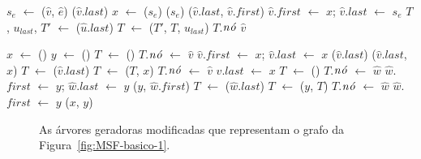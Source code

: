 \begin{algorithm}[htb]
\caption{\LCOCycle($\hat v$, $\hat e$)}
\label{Algo:LCOCycle}
\begin{algorithmic}[1]
\State $s_e$ $\gets$ \LCOFindSubNode($\hat v$, $\hat e$)
\State \linkcutEvert($\hat v$.$last$)
\State\Return
\EndIf
\State $x$ $\gets$ \linkcutParent($s_e$)
\State \linkcutDelEdge($s_e$)
\State \linkcutAddEdge($\hat v$.$last$, $\hat v$.$first$)
\State $\hat v$.$first$ $\gets$ $x$; $\hat v$.$last$ $\gets$ $s_e$
\State $T$, $u_{last}$, $T'$ $\gets$ \treapSplit($\hat u$.$last$)
\State $T$ $\gets$ \treapJoin($T'$, $T$, $u_{last}$)
\State $T$.$\mathit{n\acute{o}}$ $\hat v$
\end{algorithmic}
\end{algorithm}


\begin{algorithm}[htb]
\caption{\LCOLink($\hat v$, $\hat w$)}
\label{Algo:LCOLink}
\begin{algorithmic}[1]
\State $x$ $\gets$ \linkcutCreate()
\State $y$ $\gets$ \linkcutCreate()
  \State $T$ $\gets$ \treapCreate()
  \State $T$.$\mathit{n\acute{o}}$ $\gets$ $\hat v$
  \State $\hat v$.$first$ $\gets$ $x$; $\hat v$.$last$ $\gets$ $x$ 
\Else
  \State \linkcutEvert($\hat v$.$last$)
  \State \linkcutAddEdge($\hat v$.$last$, $x$)
  \State $T$ $\gets$ \treapGetRoot($\hat v$.$last$)
  \State $T$ $\gets$ \treapJoin($T$, $x$)
  \State $T$.$\mathit{n\acute{o}}$ $\gets$ $\hat v$
  \State $\hat v$.$last$ $\gets$ $x$
\EndIf
{}
  \State $T$ $\gets$ \treapCreate()
  \State $T$.$\mathit{n\acute{o}}$ $\gets$ $\hat w$
  \State $\hat w$.$first$ $\gets$ $y$; $\hat w$.$last$ $\gets$ $y$ 
\Else
  \State \linkcutAddEdge($y$, $\hat w$.$first$)
  \State $T$ $\gets$ \treapGetRoot($\hat w$.$last$)
  \State $T$ $\gets$ \treapJoin($y$, $T$)
  \State $T$.$\mathit{n\acute{o}}$ $\gets$ $\hat w$
  \State $\hat w$.$first$ $\gets$ $y$
\EndIf
\State \linkcutAddEdge($x$, $y$)
\end{algorithmic}
\end{algorithm}


\begin{figure}[htb]
\scalebox{1.5}{
\centering

}
\caption{As árvores geradoras modificadas que representam o grafo da Figura~\ref{fig:MSF-basico-1}.}
\label{fig:MSF-figura-4}
\end{figure}
